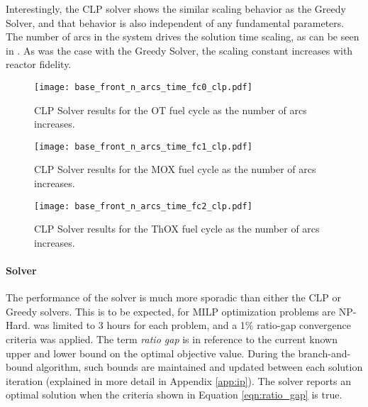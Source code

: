 Interestingly, the CLP solver shows the similar scaling behavior as the Greedy
Solver, and that behavior is also independent of any fundamental parameters. The
number of arcs in the system drives the solution time scaling, as can be seen in
. As
was the case with the Greedy Solver, the scaling constant increases with reactor
fidelity.

\begin{figure}[h!]
  \begin{center}
    \texttt{[image: base\_front\_n\_arcs\_time\_fc0\_clp.pdf]}
    \caption{
      \label{fig:base_front_n_arcs_time_fc0_clp}
      CLP Solver results for the OT fuel cycle as the number of arcs
      increases.
      }
  \end{center}
\end{figure}

\begin{figure}[h!]
  \begin{center}
    \texttt{[image: base\_front\_n\_arcs\_time\_fc1\_clp.pdf]}
    \caption{
      \label{fig:base_front_n_arcs_time_fc1_clp}
      CLP Solver results for the MOX fuel cycle as the number of arcs
      increases.
      }
  \end{center}
\end{figure}

\begin{figure}[h!]
  \begin{center}
    \texttt{[image: base\_front\_n\_arcs\_time\_fc2\_clp.pdf]}
    \caption{
      \label{fig:base_front_n_arcs_time_fc2_clp}
      CLP Solver results for the ThOX fuel cycle as the number of arcs
      increases.
      }
  \end{center}
\end{figure}

\paragraph{\cbc Solver}

The performance of the \cbc solver is much more sporadic than either the CLP or
Greedy solvers. This is to be expected, for MILP optimization problems are
NP-Hard. \cbc was limited to 3 hours for each problem, and a 1\% ratio-gap
convergence criteria was applied. The term \textit{ratio gap} is in reference to
the current known upper and lower bound on the optimal objective value. During
the branch-and-bound algorithm, such bounds are maintained and updated between
each solution iteration (explained in more detail in Appendix \ref{app:ip}). The
solver reports an optimal solution when the criteria shown in Equation
\ref{eqn:ratio_gap} is true.

